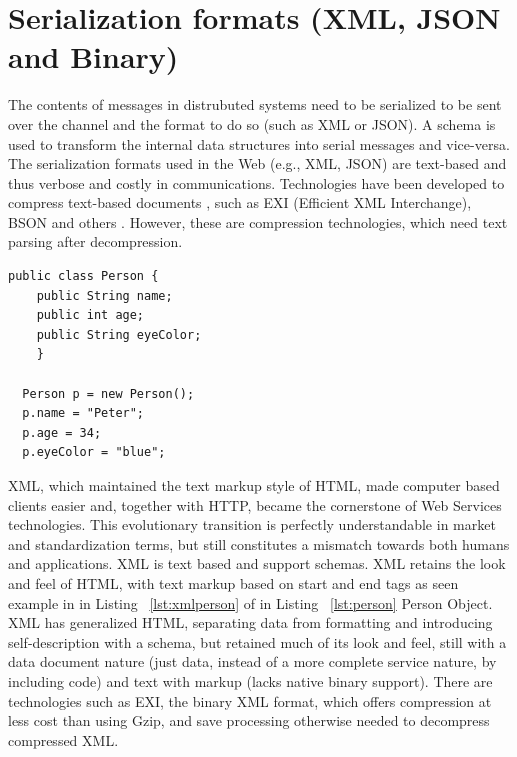 \section{Serialization formats (XML, JSON and Binary)}
\label{section:xml}
The contents of messages in distrubuted systems need to be serialized to be sent over the channel and the format to do so (such as XML or JSON). A schema is used to transform the internal data structures into serial messages and vice-versa. The serialization formats used in the Web (e.g., XML, JSON) are text-based and thus verbose and costly in communications. Technologies have been developed to compress text-based documents \citep{thesis:state5_3}, such as EXI (Efficient XML Interchange), BSON and others \citep{thesis:state5_4}. However, these are compression technologies, which need text parsing after decompression.
\begin{lstlisting}[caption=Example Person Object Class, label=lst:person]
  public class Person {
    public String name;
    public int age;
    public String eyeColor;
    }

  Person p = new Person();
  p.name = "Peter";
  p.age = 34;
  p.eyeColor = "blue";
\end{lstlisting}

XML, which maintained the text markup style of HTML, made computer based clients easier and, together with HTTP, became the cornerstone of Web Services technologies. This evolutionary transition is perfectly understandable in market and standardization terms, but still constitutes a mismatch towards both humans and applications. XML is text based and support schemas. XML retains the look and feel of HTML, with text markup based on start and end tags as seen example in in Listing ~\ref{lst:xmlperson} of in Listing ~\ref{lst:person} Person Object. XML has generalized HTML, separating data from formatting and introducing self-description with a schema, but retained much of its look and feel, still with a data document nature (just data, instead of a more complete service nature, by including code) and text with markup (lacks native binary support). There are technologies such as  EXI, the binary XML format, which offers compression at less cost than using Gzip, and save processing otherwise needed to decompress compressed XML\citep{thesis:state9}.


